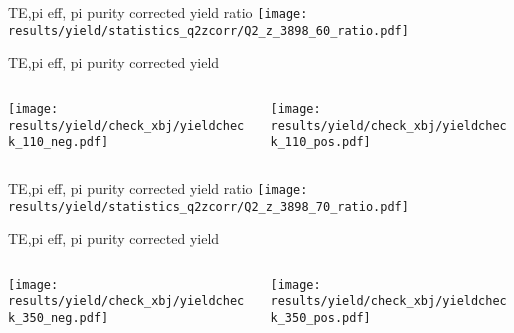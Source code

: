 \begin{frame}{TE,pi eff, pi purity corrected yield ratio}
\texttt{[image: results/yield/statistics\_q2zcorr/Q2\_z\_3898\_60\_ratio.pdf]}
\end{frame}
\begin{frame}{TE,pi eff, pi purity corrected yield}
\begin{columns}
\begin{column}[T]{0.5\textwidth}
\texttt{[image: results/yield/check\_xbj/yieldcheck\_110\_neg.pdf]}
\end{column}
\begin{column}[T]{0.5\textwidth}
\texttt{[image: results/yield/check\_xbj/yieldcheck\_110\_pos.pdf]}
\end{column}
\end{columns}
\end{frame}
\begin{frame}{TE,pi eff, pi purity corrected yield ratio}
\texttt{[image: results/yield/statistics\_q2zcorr/Q2\_z\_3898\_70\_ratio.pdf]}
\end{frame}
\begin{frame}{TE,pi eff, pi purity corrected yield}
\begin{columns}
\begin{column}[T]{0.5\textwidth}
\texttt{[image: results/yield/check\_xbj/yieldcheck\_350\_neg.pdf]}
\end{column}
\begin{column}[T]{0.5\textwidth}
\texttt{[image: results/yield/check\_xbj/yieldcheck\_350\_pos.pdf]}
\end{column}
\end{columns}
\end{frame}
